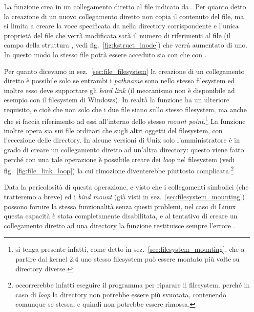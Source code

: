 La funzione crea in  un collegamento diretto al file indicato
da . Per quanto detto la creazione di un nuovo collegamento
diretto non copia il contenuto del file, ma si limita a creare la voce
specificata da  nella directory corrispondente e l'unica
proprietà del file che verrà modificata sarà il numero di riferimenti al file
(il campo  della struttura , vedi
fig.~\ref{fig:kstruct_inode}) che verrà aumentato di uno. In questo modo lo
stesso file potrà essere acceduto sia con  che
con .

Per quanto dicevamo in sez.~\ref{sec:file_filesystem} la creazione di un
collegamento diretto è possibile solo se entrambi i \textit{pathname} sono
nello stesso filesystem ed inoltre esso deve supportare gli \textit{hard link}
(il meccanismo non è disponibile ad esempio con il filesystem  di
Windows). In realtà la funzione ha un ulteriore requisito, e cioè che non solo
che i due file siano sullo stesso filesystem, ma anche che si faccia
riferimento ad essi all'interno dello stesso \textit{mount point}.\footnote{si
  tenga presente infatti, come detto in sez.~\ref{sec:filesystem_mounting},
  che a partire dal kernel 2.4 uno stesso filesystem può essere montato più
  volte su directory diverse.}
La funzione inoltre opera sia sui file ordinari che sugli altri oggetti del
filesystem, con l'eccezione delle directory. In alcune versioni di Unix solo
l'amministratore è in grado di creare un collegamento diretto ad un'altra
directory: questo viene fatto perché con una tale operazione è possibile
creare dei \textit{loop} nel filesystem (vedi fig.~\ref{fig:file_link_loop})
la cui rimozione diventerebbe piuttosto complicata.\footnote{occorrerebbe
  infatti eseguire il programma  per riparare il filesystem, perché
  in caso di \textit{loop} la directory non potrebbe essere più svuotata,
  contenendo comunque se stessa, e quindi non potrebbe essere rimossa.}

Data la pericolosità di questa operazione, e visto che i collegamenti
simbolici (che tratteremo a breve) ed i \textit{bind mount} (già visti in
sez.~\ref{sec:filesystem_mounting}) possono fornire la stessa funzionalità
senza questi problemi, nel caso di Linux questa capacità è stata completamente
disabilitata, e al tentativo di creare un collegamento diretto ad una
directory la funzione  restituisce sempre l'errore .


